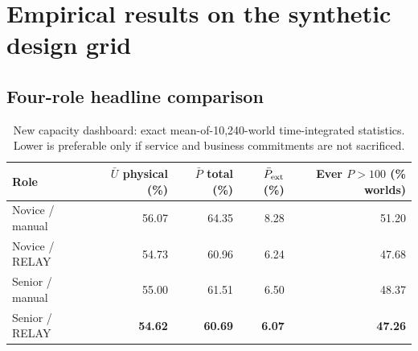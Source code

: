 \documentclass[10pt,a4paper]{article}
\theoremstyle{definition}\newtheorem{definition}[theorem]{Definition}
\theoremstyle{remark}\newtheorem{remark}[theorem]{Remark}
\newcommand{\1}{\mathbbm 1}
\begin{document}
\section{Empirical results on the synthetic design grid}
\subsection{Four-role headline comparison}
\begin{table}[htbp]\centering\small
\caption{Results from 10,240 paired synthetic one-day worlds, 40,960 archived role replays. Percentages are not operational Cathay estimates.}\label{tab:main}
\end{table}

\begin{table}[htbp]\centering\small
\caption{New capacity dashboard: exact mean-of-10,240-world time-integrated statistics. Lower is preferable only if service and business commitments are not sacrificed.}\label{tab:capacity}
\begin{tabular}{@{}lrrrr@{}}\toprule
Role & $\bar U$ physical (\%) & $\bar P$ total (\%) & $\bar P_{\rm ext}$ (\%) & Ever $P>100$ (\% worlds)\\\midrule
Novice / manual & 56.07 & 64.35 & 8.28 & 51.20\\
Novice / RELAY & 54.73 & 60.96 & 6.24 & 47.68\\
Senior / manual & 55.00 & 61.51 & 6.50 & 48.37\\
Senior / RELAY & \textbf{54.62} & \textbf{60.69} & \textbf{6.07} & \textbf{47.26}\\\bottomrule
\end{tabular}
\end{table}
\end{document}
